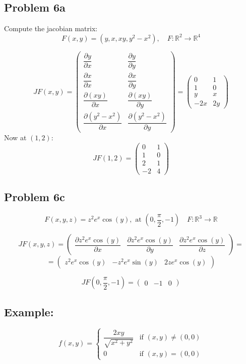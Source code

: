 \documentclass[11pt]{article}
\begin{document}
\subsection*{Problem 6a}
Compute the jacobian matrix:
\[
F(x,y) = (y,x,xy,y^2 - x^2), \quad F : \mathbb{R}^2 \rightarrow \mathbb{R}^4
\]

\[
JF(x,y) =
\begin{pmatrix}
    \dfrac{\partial y}{\partial x} & \dfrac{\partial y}{\partial y} \\
    \dfrac{\partial x}{\partial x} & \dfrac{\partial x}{\partial y} \\
    \dfrac{\partial (xy)}{\partial x} & \dfrac{\partial (xy)}{\partial y} \\
    \dfrac{\partial (y^2 - x^2)}{\partial x} & \dfrac{\partial (y^2 - x^2)}{\partial y}
\end{pmatrix} =
\begin{pmatrix}
    0 & 1 \\
    1 & 0 \\
    y & x \\
    -2x & 2y
\end{pmatrix}
\]
Now at $(1,2)$:
\[
JF(1,2) =
\begin{pmatrix}
    0 & 1 \\
    1 & 0 \\
    2 & 1 \\
    -2 & 4
\end{pmatrix}
\]

\subsection*{Problem 6c}
\[
F(x,y,z) = z^2 e^x \cos(y), \text{ at } (0, \frac{\pi}{2}, -1) \quad F : \mathbb{R}^3 \rightarrow \mathbb{R}
\]

\[
JF(x,y,z) =
\begin{pmatrix}
    \dfrac{\partial z^2 e^x \cos(y)}{\partial x} & \dfrac{\partial z^2 e^x \cos(y)}{\partial y} & \dfrac{\partial z^2 e^x \cos(y)}{\partial z}
\end{pmatrix} =
\]
\[
= 
\begin{pmatrix}
    z^2 e^x \cos(y) & -z^2 e^x \sin(y) & 2z e^x \cos(y)
\end{pmatrix}
\]

\[
JF(0, \frac{\pi}{2}, -1) =
\begin{pmatrix}
    0 & -1 & 0
\end{pmatrix}
\]

\subsection*{Example:}
\[
f(x,y) = 
\begin{cases}
    \dfrac{2xy}{\sqrt{x^2 + y^2}} & \text{if } (x,y) \neq (0,0) \\
    0 & \text{if } (x,y) = (0,0)
\end{cases}
\]
\end{document}
